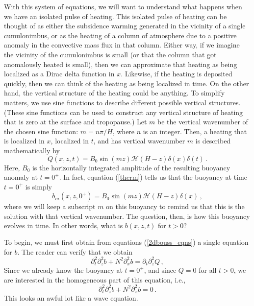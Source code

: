 \documentclass[12pt]{article}
\begin{document}
With this system of equations, we will want to understand what happens when we have an isolated pulse of heating.  This isolated pulse of heating can be thought of as either the subsidence warming generated in the vicinity of a single cumulonimbus, or as the heating of a column of atmosphere due to a positive anomaly in the convective mass flux in that column.  Either way, if we imagine the vicinity of the cumulonimbus is small (or that the column that got anomalously heated is small), then we can approximate that heating as being localized as a Dirac delta function in $x$.  Likewise, if the heating is deposited quickly, then we can think of the heating as being localized in time.  On the other hand, the vertical structure of the heating could be anything.  To simplify matters, we use sine functions to describe different possible vertical structures.  (These sine functions can be used to construct any vertical structure of heating that is zero at the surface and tropopause.)  Let $m$ be the vertical wavenumber of the chosen sine function: $m = n\pi/H$, where $n$ is an integer.  Then, a heating that is localized in $x$, localized in $t$, and has vertical wavenumber $m$ is described mathematically by
\begin{equation}
Q(x,z,t) = B_0 \sin(mz) \mathcal{H}(H-z) \delta(x) \delta(t) \, . \label{bsource}
\end{equation}
Here, $B_0$ is the horizontally integrated amplitude of the resulting buoyancy anomaly at $t=0^+$.  In fact, equation (\ref{therm}) tells us that the buoyancy at time $t=0^+$ is simply
\begin{equation}
b_m(x,z,0^+) = B_0 \sin(mz) \mathcal{H}(H-z) \delta(x) \, , \label{b_initial}
\end{equation}
where we will keep a subscript $m$ on this buoyancy to remind us that this is the solution with that vertical wavenumber.  The question, then, is how this buoyancy evolves in time.  In other words, what is $b(x,z,t)$ for $t>0$?


To begin, we must first obtain from equations (\ref{2dbouss_eqns}) a single equation for $b$.  The reader can verify that we obtain
\begin{equation}
\partial_t^2 \partial_z^2 b + N^2 \partial_x^2 b = \partial_t \partial_z^2 Q \, , \label{b_wave}
\end{equation}
Since we already know the buoyancy at $t=0^+$, and since $Q=0$ for all $t>0$, we are interested in the homogeneous part of this equation, i.e.,
\begin{equation}
\partial_t^2 \partial_z^2 b + N^2 \partial_x^2 b = 0 \, . \label{b_wave_homo}
\end{equation}
This looks an awful lot like a wave equation.
\end{document}
